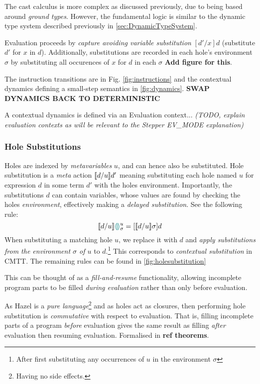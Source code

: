 The cast calculus is more complex as discussed previously, due to being based around \textit{ground types}. However, the fundamental logic is similar to the dynamic type system described previously in \cref{sec:DynamicTypeSystem}.


Evaluation proceeds by \textit{capture avoiding variable substitution} $[d'/x]d$ (substitute $d'$ for $x$ in $d$). Additionally, substitutions are recorded in each hole's environment $\sigma$ by substituting all occurences of $x$ for $d$ in each $\sigma$ \textbf{Add figure for this}. 

The instruction transitions are in Fig. \ref{fig:instructions} and the contextual dynamics defining a small-step semantics in \ref{fig:dynamics}. \textbf{SWAP DYNAMICS BACK TO DETERMINISTIC}

A contextual dynamics is defined via an Evaluation context... \textit{(TODO, explain evaluation contexts as will be relevant to the Stepper EV\_MODE explanation)}

\subsubsection{Hole Substitutions}\label{sec:HoleSubstitution}
Holes are indexed by \textit{metavariables} $u$, and can hence also be substituted. Hole substitution is a \textit{meta} action $\llbracket d/u \rrbracket d'$ meaning substituting each hole named $u$ for expression $d$ in some term $d'$ with the holes environment. Importantly, the substitutions $d$ can contain variables, whose values are found by checking the holes \textit{environment}, effectively making a \textit{delayed substitution}. See the following rule:
 \[\llbracket d/u \rrbracket {\color{teal}\llparenthesis}  {\color{teal}\rrparenthesis}^u_\sigma = [\llbracket d/u \rrbracket \sigma]d\]
When substituting a matching hole $u$, we replace it with $d$ and \textit{apply substitutions from the environment $\sigma$ of $u$} to $d$.\footnote{After first substituting any occurrences of $u$ in the environment $\sigma$} This corresponds to \textit{contextual substitution} in CMTT. The remaining rules can be found in \ref{fig:holesubstitution}
 
 This can be thought of as a \textit{fill-and-resume} functionality, allowing incomplete program parts to be filled \textit{during evaluation} rather than only before evaluation.

As Hazel is a \textit{pure language}\footnote{Having no side effects.} and as holes act as closures, then performing hole substitution is \textit{commutative} with respect to evaluation. That is, filling incomplete parts of a program \textit{before} evaluation gives the same result as filling \textit{after} evaluation then resuming evaluation. Formalised in \textbf{ref theorems}.

